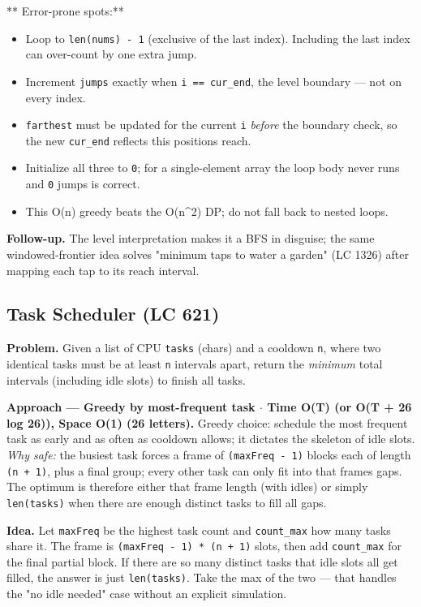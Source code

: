 \documentclass[11pt]{article}
\providecommand{\tightlist}{\setlength{\itemsep}{1pt}\setlength{\parskip}{0pt}}
\begin{document}
** Error-prone spots:**

\begin{itemize}
\tightlist
\item
  Loop to \texttt{len(nums)\ -\ 1} (exclusive of the last index). Including the last index can over-count by one extra jump.
\item
  Increment \texttt{jumps} exactly when \texttt{i\ ==\ cur\_end}, the level boundary --- not on every index.
\item
  \texttt{farthest} must be updated for the current \texttt{i} \emph{before} the boundary check, so the new \texttt{cur\_end} reflects this position\textquotesingle s reach.
\item
  Initialize all three to \texttt{0}; for a single-element array the loop body never runs and \texttt{0} jumps is correct.
\item
  This O(n) greedy beats the O(n\^{}2) DP; do not fall back to nested loops.
\end{itemize}

\textbf{Follow-up.} The level interpretation makes it a BFS in disguise; the same windowed-frontier idea solves "minimum taps to water a garden" (LC 1326) after mapping each tap to its reach interval.

\subsection{Task Scheduler (LC 621)}\label{task-scheduler-lc-621}

\textbf{Problem.} Given a list of CPU \texttt{tasks} (chars) and a cooldown \texttt{n}, where two identical tasks must be at least \texttt{n} intervals apart, return the \emph{minimum} total intervals (including idle slots) to finish all tasks.

\textbf{Approach --- Greedy by most-frequent task \(\cdot\) Time O(T) (or O(T + 26 log 26)), Space O(1) (26 letters).} Greedy choice: schedule the most frequent task as early and as often as cooldown allows; it dictates the skeleton of idle slots. \emph{Why safe:} the busiest task forces a frame of \texttt{(maxFreq\ -\ 1)} blocks each of length \texttt{(n\ +\ 1)}, plus a final group; every other task can only fit into that frame\textquotesingle s gaps. The optimum is therefore either that frame length (with idles) or simply \texttt{len(tasks)} when there are enough distinct tasks to fill all gaps.

\textbf{Idea.} Let \texttt{maxFreq} be the highest task count and \texttt{count\_max} how many tasks share it. The frame is \texttt{(maxFreq\ -\ 1)\ *\ (n\ +\ 1)} slots, then add \texttt{count\_max} for the final partial block. If there are so many distinct tasks that idle slots all get filled, the answer is just \texttt{len(tasks)}. Take the max of the two --- that handles the "no idle needed" case without an explicit simulation.
\end{document}
